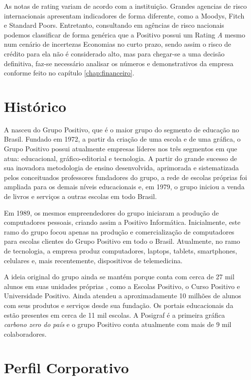 As notas de rating variam de acordo com a instituição. Grandes agencias de risco internacionais apresentam indicadores de forma diferente, como a Moodys, Fitch e Standard Poors. Entretanto, consultando em agências de risco nacionais podemos classificar de forma genérica que a Positivo possui um Rating \emph{A} mesmo num cenário de incertezas Economias no curto prazo, sendo assim o risco de crédito para ela não é considerado alto, mas para chegar-se a uma decisão definitiva, faz-se necessário analisar os números e demonstrativos da empresa conforme feito no capítulo \ref{chap:financeiro}.

\section{Histórico}
A \nomePositivo{} nasceu do Grupo Positivo, que é o maior grupo do segmento de educação no Brasil\cite{historico2018}. Fundado em 1972, a partir da criação de uma escola e de uma gráfica, o Grupo Positivo possui atualmente empresas líderes nos três segmentos em que atua: educacional, gráfico-editorial e tecnologia. A partir do grande sucesso de sua inovadora metodologia de ensino desenvolvida, aprimorada e sistematizada pelos conceituados professores fundadores do grupo, a rede de escolas próprias foi ampliada para os demais níveis educacionais e, em 1979, o grupo iniciou a venda de livros e serviços a outras escolas em todo Brasil.

Em 1989, os mesmos empreendedores do grupo iniciaram a produção de computadores pessoais, criando assim a Positivo Informática. Inicialmente, este ramo do grupo focou apenas na produção e comercialização de computadores para escolas clientes do Grupo Positivo em todo o Brasil. Atualmente, no ramo de tecnologia, a empresa produz computadores, laptops, tablets, smartphones, celulares e, mais recentemente, dispositivos de telemedicina. 

A ideia original do grupo ainda se mantém porque conta com cerca de 27 mil alunos em suas unidades próprias , como a Escolas Positivo, o Curso Positivo e Universidade Positivo. Ainda atendeu a aproximadamente 10 milhões de alunos com seus produtos e serviços desde sua fundação. Os portais educacionais da \nomePositivo{} estão presentes em cerca de 11 mil escolas. A Posigraf é a primeira gráfica \emph{carbono zero do país} e o grupo Positivo conta atualmente com mais de 9 mil colaboradores.

\section{Perfil Corporativo}

